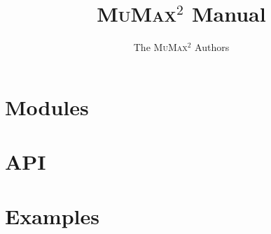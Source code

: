 \documentclass[a4paper, twoside]{article}
\newcommand{\mumax}{\textsc{MuMax}$^2$\xspace}
\begin{document}
\hypersetup{breaklinks=true}
\setlength{\parindent}{0cm}

\title{\mumax Manual}
\author{The \mumax Authors}
\maketitle


\tableofcontents

\section{Modules}


\section{API}


\section{Examples}


\appendix
%
%
\printindex
\end{document}

